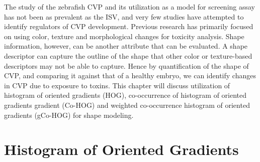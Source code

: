 The study of the zebrafish CVP and its utilization as a model for screening assay has not been as prevalent as the ISV, and very few studies have attempted to identify regulators of CVP development. Previous research has primarily focused on using color, texture \cite{Tran07} and morphological changes \cite{Feng05} for toxicity analysis. Shape information, however, can be another attribute that can be evaluated. A shape descriptor can capture the outline of the shape that other color or texture-based descriptors may not be able to capture. Hence
by quantification of the shape of CVP, and comparing it against that of a healthy embryo, we can identify changes in CVP due to exposure to toxins. This chapter will discuss utilization of histogram of oriented gradients (HOG), co-occurrence of histogram of oriented gradients gradient (Co-HOG) and weighted co-occurrence histogram of oriented gradients (gCo-HOG) for shape modeling.

\section{Histogram of Oriented Gradients}

